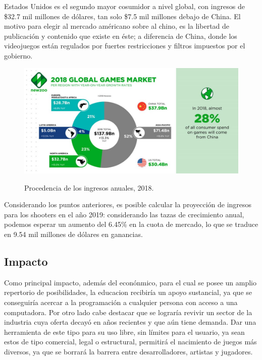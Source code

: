 \documentclass[]{article}
\begin{document}
 Estados Unidos es el segundo mayor cosumidor a nivel global, con ingresos de \$32.7 mil millones de d\'olares, tan solo \$7.5 mil millones debajo de China. 
 El motivo para elegir al mercado am\'ericano sobre al chino, es la libertad de publicaci\'on y contenido que existe en \'este; a diferencia de China, donde los videojuegos est\'an regulados por fuertes restricciones y filtros impuestos por el gobierno.

\begin{figure}[H]
	
	\centering
	\includegraphics[width=1\textwidth]{GGM2}
	\caption{Procedencia de los ingresos anuales, 2018.  } \cite{Newzoo} 
	\label{NWZOO}
	
\end{figure}

Considerando los puntos anteriores, es posible calcular la proyecci\'on de ingresos para los shooters en el a\~no 2019: considerando las tazas de crecimiento anual, podemos esperar un aumento del 6.45\% en la cuota de mercado, lo que se traduce en 9.54 mil millones de d\'olares en ganancias. 

\subsection{Impacto}
Como principal impacto, adem\'as del econ\'onmico, para el cual se posee un amplio repertorio de posibilidades, la educacion recibir\'ia un apoyo sustancial, ya que se conseguir\'ia acercar a la programaci\'on a cualquier persona con acceso a una computadora. Por otro lado cabe destacar que se lograr\'ia revivir un sector de la industria cuya oferta decay\'o en a\~nos recientes y que a\'un tiene demanda. Dar una herramienta de este tipo para su uso libre, sin l\'imites para el usuario, ya sean estos de tipo comercial, legal o estructural, permitir\'a el nacimiento de juegos m\'as diversos, ya que se borrar\'a la barrera entre desarrolladores, artistas y jugadores.
\end{document}
